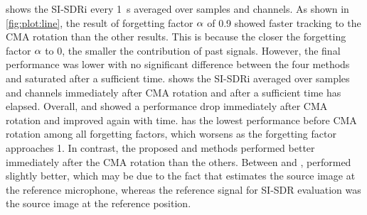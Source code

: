\documentclass[sip,biber]{now-journal}
\begin{document}
 shows the SI-SDRi every \SI{1}{\second} averaged over samples and channels.
As shown in \cref{fig:plot:line}, the result of forgetting factor $\alpha$ of 0.9 showed faster tracking to the CMA rotation than the other results.
This is because the closer the forgetting factor $\alpha$ to 0, the smaller the contribution of past signals.
However, the final performance was lower with no significant difference between the four methods and saturated after a sufficient time.
 shows the SI-SDRi averaged over samples and channels immediately after CMA rotation and after a sufficient time has elapsed.
Overall, \NaiveIVA{} and \ResetIVA{} showed a performance drop immediately after CMA rotation and improved again with time.
\ResetIVA{} has the lowest performance before CMA rotation among all forgetting factors, which worsens as the forgetting factor approaches 1.
In contrast, the proposed \SFIIVAm{} and \SFIIVAo{} methods performed better immediately after the CMA rotation than the others.
Between \SFIIVAm{} and \SFIIVAo{}, \SFIIVAm{} performed slightly better,
which may be due to the fact that \SFIIVAo{} estimates the source image at the reference microphone,
whereas the reference signal for SI-SDR evaluation was the source image at the reference position.
\end{document}
